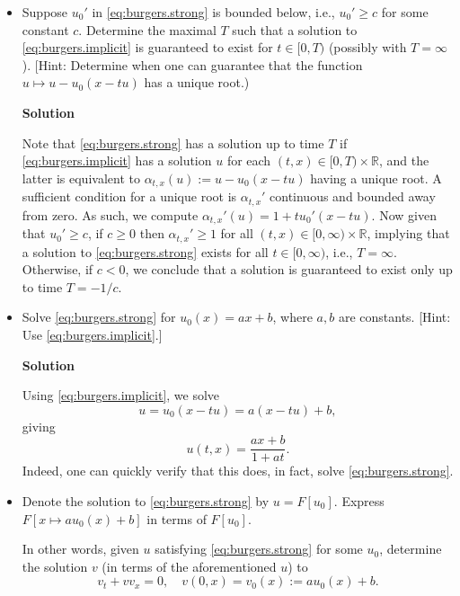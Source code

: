 \documentclass{article}
\begin{document}
\begin{itemize}
\item[2.] Suppose $u_0'$ in \eqref{eq:burgers.strong} is bounded below, i.e., $u_0' \geq c$ for some constant $c$. Determine the maximal $T$ such that a solution to \eqref{eq:burgers.implicit} is guaranteed to exist for $t \in [0,T)$ (possibly with $T = \infty$). [Hint: Determine when one can guarantee that the function $u \mapsto u - u_0(x - tu)$ has a unique root.)

\textbf{Solution}

Note that \eqref{eq:burgers.strong} has a solution up to time $T$ if \eqref{eq:burgers.implicit} has a solution $u$ for each $(t,x) \in [0,T) \times \mathbb{R}$, and the latter is equivalent to $\alpha_{t,x}(u) := u - u_0(x - tu)$ having a unique root. A sufficient condition for a unique root is $\alpha_{t,x}'$ continuous and bounded away from zero. As such, we compute $\alpha_{t,x}'(u) = 1 + t u_0'(x - tu)$. Now given that $u_0' \geq c$, if $c \geq 0$ then $\alpha_{t,x}' \geq 1$ for all $(t,x) \in [0,\infty) \times \mathbb{R}$, implying that a solution to \eqref{eq:burgers.strong} exists for all $t \in [0,\infty)$, i.e., $T = \infty$. Otherwise, if $c < 0$, we conclude that a solution is guaranteed to exist only up to time $T = -1/c$.

\item[3.] Solve \eqref{eq:burgers.strong} for $u_0(x) = ax + b$, where $a,b$ are constants. [Hint: Use \eqref{eq:burgers.implicit}.]

\textbf{Solution}

Using \eqref{eq:burgers.implicit}, we solve
\begin{equation*}
u = u_0 \left( x - tu \right) = a \left( x - tu \right) + b,
\end{equation*}
giving
\begin{equation*}
u(t,x) = \frac{ax + b}{1 + at}.
\end{equation*}
Indeed, one can quickly verify that this does, in fact, solve \eqref{eq:burgers.strong}.

\item[4.] Denote the solution to \eqref{eq:burgers.strong} by $u = F \left[ u_0 \right]$. Express $F \left[ x \mapsto a u_0(x) + b \right]$ in terms of $F \left[ u_0 \right]$.

In other words, given $u$ satisfying \eqref{eq:burgers.strong} for some $u_0$, determine the solution $v$ (in terms of the aforementioned $u$) to
\begin{equation*}
v_t + v v_x = 0, \quad v(0,x) = v_0(x) := a u_0(x) + b.
\end{equation*}


\end{itemize}
\end{document}

